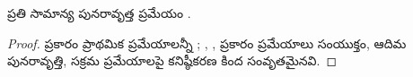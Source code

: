 \documentclass[../../../include/open-logic-section]{subfiles}
\begin{document}
\begin{prop}
  ప్రతి సామాన్య పునరావృత్త ప్రమేయం
  .
\end{prop}

\begin{proof}
  ప్రకారం ప్రాథమిక ప్రమేయాలన్నీ
 ;
 , ,
  ప్రకారం
 ప్రమేయాలు సంయుక్తం, ఆదిమ పునరావృత్తి,
 సక్రమ ప్రమేయాలపై కనిష్ఠీకరణ కింద సంవృతమైనవి.
\end{proof}
\end{document}
